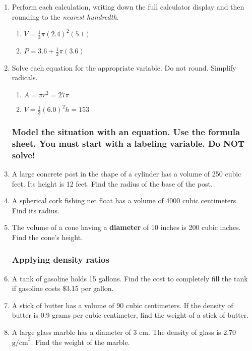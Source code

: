 \documentclass[12pt, twoside]{article}
\begin{document}
\begin{enumerate}
\newpage
\item Perform each calculation, writing down the full calculator display and then rounding to the \emph{nearest hundredth}.
  \begin{multicols}{2}
  \begin{enumerate}
    \item $V=\frac{1}{3} \pi (2.4)^2(5.1)$
    \item $P=3.6 + \frac{1}{2} \pi (3.6)$  
  \end{enumerate}
  \end{multicols}\vspace{2cm}

\item Solve each equation for the appropriate variable. Do not round. Simplify radicals.
  \begin{multicols}{2}
  \begin{enumerate}[itemsep=2cm]
    \item $A=\pi r^2=27\pi$
    \item $V=\frac{1}{3}(6.0)^2h=153$  
  \end{enumerate}
  \end{multicols}\vspace{5cm}

  \subsubsection*{Model the situation with an equation. Use the formula sheet. You must start with a labeling variable. \hfill Do NOT solve!}

\item A large concrete post in the shape of a cylinder has a volume of 250 cubic feet. Its height is 12 feet. Find the radius of the base of the post. \vspace{2cm}

\item A spherical cork fishing net float has a volume of 4000 cubic centimeters. Find its radius. \vspace{2cm}

\item The volume of a cone having a \textbf{diameter} of 10 inches is 200 cubic inches. Find the cone's height. \vspace{2cm}

  \newpage
  \subsubsection*{Applying density ratios}
\item A tank of gasoline holds 15 gallons. Find the cost to completely fill the tank if gasoline costs \$3.15 per gallon. \vspace{3cm}
\item A stick of butter has a volume of 90 cubic centimeters. If the density of butter is 0.9 grams per cubic centimeter, find the weight of a stick of butter. \vspace{3cm}
\item A large glass marble has a diameter of 3 cm. The density of glass is 2.70 $\mathrm{g/cm}^3$. Find the weight of the marble. \vspace{3cm}


\end{enumerate}
\end{document}
